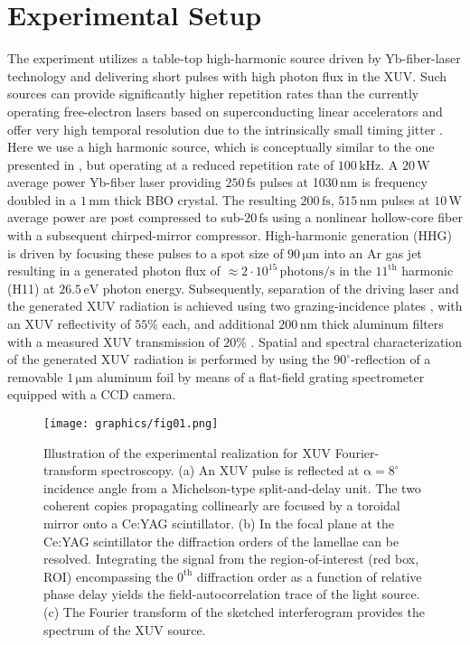 \documentclass[fleqn,10pt]{wlscirep}
\begin{document}
\section{Experimental Setup}

The experiment utilizes a table-top high-harmonic source driven by Yb-fiber-laser technology and delivering short pulses with high photon flux in the XUV. Such sources can provide significantly higher repetition rates than the currently operating free-electron lasers based on superconducting linear accelerators \cite{Faatz2016} and offer very high temporal resolution due to the intrinsically small timing jitter \cite{Rothhardt2016}. Here we use a high harmonic source, which is conceptually similar to the one presented in \cite{Klas2021}, but operating at a reduced repetition rate of $\mathrm{100\,kHz}$. A $\mathrm{20\,W}$ average power Yb-fiber laser providing $\mathrm{250\,fs}$ pulses at 1030\,nm is frequency doubled in a $\mathrm{1\,mm}$ thick BBO crystal. The resulting $\mathrm{200\,fs}$, $\mathrm{515\,nm}$ pulses at $\mathrm{10\,W}$ average power are post compressed to sub-$\mathrm{20\,fs}$ using a nonlinear hollow-core fiber with a subsequent chirped-mirror compressor. High-harmonic generation (HHG) is driven by focusing these pulses to a spot size of $\mathrm{90\,\mu m}$ into an Ar gas jet resulting in a generated photon flux of $\approx\mathrm{2\cdot 10^{15}\,photons/s}$ in the $\mathrm{11^{th}}$ harmonic (H11) at $\mathrm{26.5\,eV}$ photon energy. Subsequently, separation of the driving laser and the generated XUV radiation is achieved using two grazing-incidence plates \cite{Pronin2011}, with an XUV reflectivity of $\mathrm{55\%}$ each, and additional $\mathrm{200\,nm}$ thick aluminum filters with a measured XUV transmission of $\mathrm{20\%}$ \cite{Hilbert2020}. Spatial and spectral characterization of the generated XUV radiation is performed by using the $\mathrm{90^{\circ}}$-reflection of a removable $\mathrm{1\,\mu m}$ aluminum foil by means of a flat-field grating spectrometer equipped with a CCD camera.\\

\begin{figure}[t!]
\centering
\texttt{[image: graphics/fig01.png]}
\caption{Illustration of the experimental realization for XUV Fourier-transform spectroscopy. (a) An XUV pulse is reflected at $\mathrm{\alpha=8^{\circ}}$ incidence angle from a Michelson-type split-and-delay unit. The two coherent copies propagating collinearly are focused by a toroidal mirror onto a Ce:YAG scintillator. (b) In the focal plane at the Ce:YAG scintillator the diffraction orders of the lamellae can be resolved. Integrating the signal from the region-of-interest (red box, ROI) encompassing the $\mathrm{0^{th}}$ diffraction order as a function of relative phase delay yields the field-autocorrelation trace of the light source. (c) The Fourier transform of the sketched interferogram provides the spectrum of the XUV source.}
\label{fig:SDU}
\end{figure}
\end{document}
